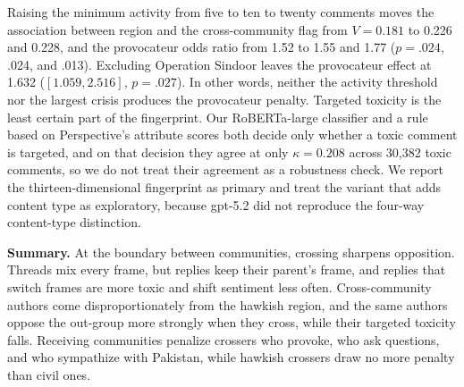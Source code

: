 Raising the minimum activity from five to ten to twenty comments moves the association between region and the cross-community flag from $V = 0.181$ to 0.226 and 0.228, and the provocateur odds ratio from 1.52 to 1.55 and 1.77 ($p = .024$, .024, and .013). Excluding Operation Sindoor leaves the provocateur effect at 1.632 ($[1.059, 2.516]$, $p = .027$). In other words, neither the activity threshold nor the largest crisis produces the provocateur penalty. Targeted toxicity is the least certain part of the fingerprint. Our RoBERTa-large classifier and a rule based on Perspective's attribute scores both decide only whether a toxic comment is targeted, and on that decision they agree at only $\kappa = 0.208$ across 30,382 toxic comments, so we do not treat their agreement as a robustness check. We report the thirteen-dimensional fingerprint as primary and treat the variant that adds content type as exploratory, because gpt-5.2 did not reproduce the four-way content-type distinction.

\textbf{Summary.} At the boundary between communities, crossing sharpens opposition. Threads mix every frame, but replies keep their parent's frame, and replies that switch frames are more toxic and shift sentiment less often. Cross-community authors come disproportionately from the hawkish region, and the same authors oppose the out-group more strongly when they cross, while their targeted toxicity falls. Receiving communities penalize crossers who provoke, who ask questions, and who sympathize with Pakistan, while hawkish crossers draw no more penalty than civil ones.

